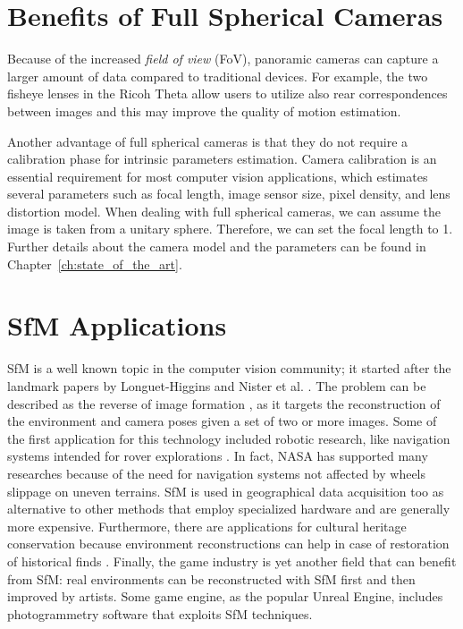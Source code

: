 \section{Benefits of Full Spherical Cameras}
Because of the increased \textit{field of view} (FoV), panoramic cameras can capture a larger amount of data compared to traditional devices. For example, the two fisheye lenses in the Ricoh Theta allow users to utilize also rear correspondences between images and this may improve the quality of motion estimation.

Another advantage of full spherical cameras is that they do not require a calibration phase for intrinsic parameters estimation. Camera calibration is an essential requirement for most computer vision applications, which estimates several parameters such as focal length, image 
sensor size, pixel density, and lens distortion model. When dealing with full spherical cameras, we can assume the image is taken from a unitary sphere. Therefore, we can set the focal length to 1. Further details about the camera model and the parameters can be found in Chapter~\ref{ch:state_of_the_art}.

\section{SfM Applications}
SfM is a well known topic in the computer vision community; it started after 
the landmark papers by Longuet-Higgins \cite{longuet1981computer} and
Nister et al. \cite{moravec1980obstacle}.
The problem can be described as the reverse of image formation
\cite{Wei2013}, as it targets the reconstruction of the environment 
and camera poses given a set of two or more images.
Some of the first application for this technology included robotic research, 
like navigation systems intended for rover explorations 
\cite{moravec1980obstacle,durrant1996localization}. In fact, NASA has supported
many researches because of the need for navigation systems not affected by wheels
slippage on uneven terrains.
SfM is used in geographical data acquisition too
\cite{fonstad2013topographic, westoby2012structure, james2012straightforward}
as alternative to other methods that employ specialized hardware and are generally more expensive.
Furthermore, there are applications for cultural heritage conservation because 
environment reconstructions can help in case of restoration of historical finds
\cite{kraus2007photogrammetry}.
Finally, the game industry is yet another field that can benefit from 
SfM: real environments can be reconstructed with SfM first and then 
improved by artists. Some game engine, as the popular Unreal Engine\registered,
includes photogrammetry software that exploits SfM techniques. 
